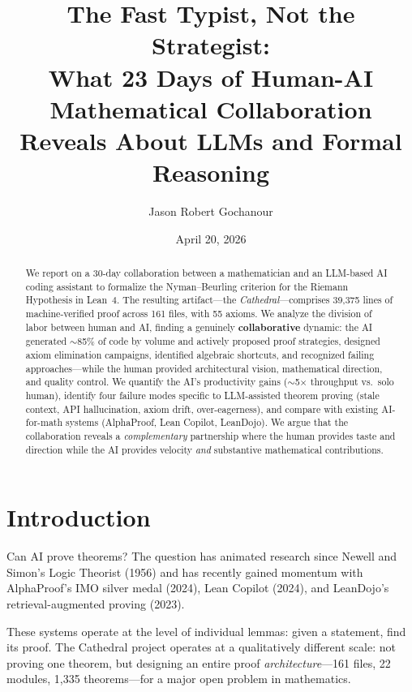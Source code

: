\documentclass[11pt,a4paper]{article}
\title{%
  The Fast Typist, Not the Strategist:\\
  What 23 Days of Human-AI Mathematical Collaboration\\
  Reveals About LLMs and Formal Reasoning%
}
\author{
  Jason Robert Gochanour
}
\date{April 20, 2026}
\begin{document}
\maketitle

\begin{abstract}
We report on a 30-day collaboration between a mathematician and an
LLM-based AI coding assistant to formalize the Nyman--Beurling
criterion for the Riemann Hypothesis in Lean~4. The resulting
artifact---the \emph{Cathedral}---comprises 39,375 lines of
machine-verified proof across 161 files, with 55
axioms. We analyze the division of labor between human and AI,
finding a genuinely \textbf{collaborative} dynamic: the AI
generated $\sim$85\% of code by volume and actively proposed
proof strategies, designed axiom elimination campaigns, identified
algebraic shortcuts, and recognized failing approaches---while the
human provided architectural vision, mathematical direction, and
quality control. We quantify the AI's productivity gains
($\sim$5$\times$ throughput vs.\ solo human), identify four failure
modes specific to LLM-assisted theorem proving (stale context, API
hallucination, axiom drift, over-eagerness), and compare with
existing AI-for-math systems (AlphaProof, Lean Copilot, LeanDojo).
We argue that the collaboration reveals a \emph{complementary}
partnership where the human provides taste and direction while the
AI provides velocity \emph{and} substantive mathematical
contributions.
\end{abstract}

\tableofcontents

\section{Introduction}

Can AI prove theorems? The question has animated research since
Newell and Simon's Logic Theorist (1956) and has recently gained
momentum with AlphaProof's IMO silver medal (2024), Lean Copilot
(2024), and LeanDojo's retrieval-augmented proving (2023).

These systems operate at the level of individual lemmas: given a
statement, find its proof. The Cathedral project operates at a
qualitatively different scale: not proving one theorem, but designing
an entire proof \emph{architecture}---161 files, 22 modules, 1,335
theorems---for a major open problem in mathematics.
\end{document}
